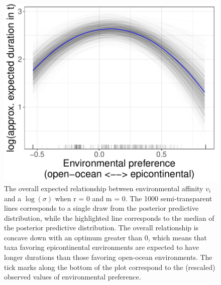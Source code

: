 \documentclass{article}
\begin{document}
\begin{figure}[ht]
  \centering
  \includegraphics[height = 0.5\textheight,width=\textwidth,keepaspectratio=true]{figure/env_effect_3}
  \caption{The overall expected relationship between environmental affinity \(v_{i}\) and a \(\log(\sigma)\) when r = 0 and m = 0. The 1000 semi-transparent lines corresponds to a single draw from the posterior predictive distribution, while the highlighted line corresponds to the median of the posterior predictive distribution. The overall relationship is concave down with an optimum greater than 0, which means that taxa favoring epicontinental environments are expected to have longer durations than those favoring open-ocean environments. The tick marks along the bottom of the plot correspond to the (rescaled) observed values of environmental preference.}
  \label{fig:env_mean_high}
\end{figure}
\end{document}
